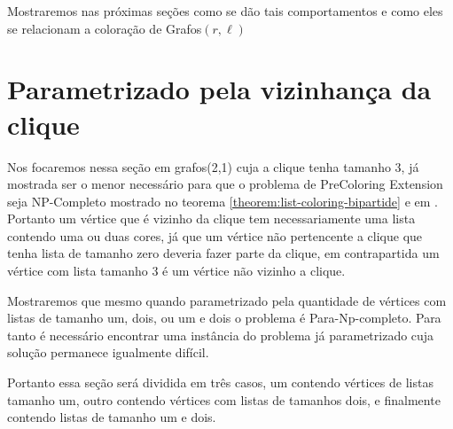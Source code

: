 Mostraremos nas próximas seções como se dão tais comportamentos e como eles se relacionam a coloração de Grafos$(r,\ell)$

\section{Parametrizado pela vizinhança da clique}
Nos focaremos nessa seção em grafos(2,1) cuja a clique tenha tamanho 3, já mostrada ser o menor necessário para que o problema de PreColoring Extension seja NP-Completo mostrado no teorema \ref{theorem:list-coloring-bipartide} e em \cite{kratochvil94,hujter93}. Portanto um vértice que é vizinho da clique tem necessariamente uma lista contendo uma ou duas cores, já que um vértice não pertencente a clique que tenha lista de tamanho zero deveria fazer parte da clique, em contrapartida um vértice com lista tamanho 3 é um vértice não vizinho a clique. 

Mostraremos que mesmo quando parametrizado pela quantidade de vértices com listas de tamanho um, dois, ou um e dois o problema é Para-Np-completo. Para tanto é necessário encontrar uma instância do problema já parametrizado cuja solução permanece igualmente difícil.

Portanto essa seção será dividida em três casos, um contendo vértices de listas tamanho um, outro contendo vértices com listas de tamanhos dois, e finalmente contendo listas de tamanho um e dois.

